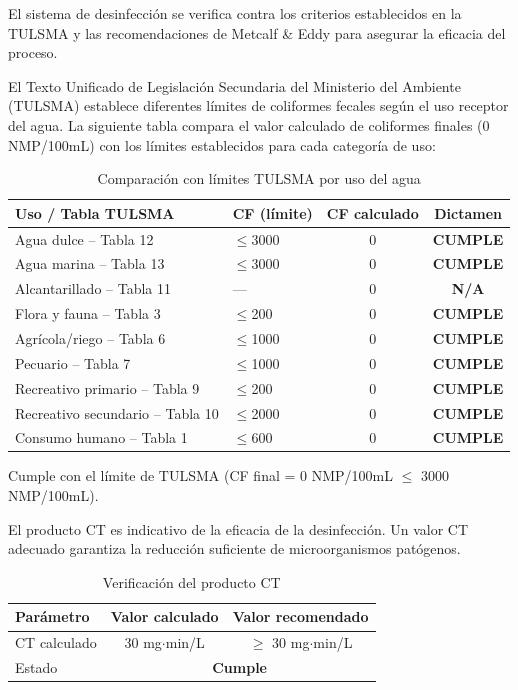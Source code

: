 \documentclass[12pt,a4paper]{article}
\begin{document}
El sistema de desinfección se verifica contra los criterios establecidos en la TULSMA y las recomendaciones de Metcalf \& Eddy para asegurar la eficacia del proceso.


El Texto Unificado de Legislación Secundaria del Ministerio del Ambiente (TULSMA) establece diferentes límites de coliformes fecales según el uso receptor del agua. La siguiente tabla compara el valor calculado de coliformes finales (0 NMP/100mL) con los límites establecidos para cada categoría de uso:

\begin{table}[H]
\centering
\caption{Comparación con límites TULSMA por uso del agua}
\small
\begin{tabular}{@{}llcc@{}}
\toprule
\textbf{Uso / Tabla TULSMA} & \textbf{CF (límite)} & \textbf{CF calculado} & \textbf{Dictamen} \\
\midrule
Agua dulce -- Tabla 12 & $\leq$3000 & 0 & \textbf{CUMPLE} \\
Agua marina -- Tabla 13 & $\leq$3000 & 0 & \textbf{CUMPLE} \\
Alcantarillado -- Tabla 11 & --- & 0 & \textbf{N/A} \\
Flora y fauna -- Tabla 3 & $\leq$200 & 0 & \textbf{CUMPLE} \\
Agrícola/riego -- Tabla 6 & $\leq$1000 & 0 & \textbf{CUMPLE} \\
Pecuario -- Tabla 7 & $\leq$1000 & 0 & \textbf{CUMPLE} \\
Recreativo primario -- Tabla 9 & $\leq$200 & 0 & \textbf{CUMPLE} \\
Recreativo secundario -- Tabla 10 & $\leq$2000 & 0 & \textbf{CUMPLE} \\
Consumo humano -- Tabla 1 & $\leq$600 & 0 & \textbf{CUMPLE} \\
\bottomrule
\end{tabular}
\end{table}

Cumple con el límite de TULSMA (CF final = 0 NMP/100mL $≤$ 3000 NMP/100mL).

El producto CT es indicativo de la eficacia de la desinfección. Un valor CT adecuado garantiza la reducción suficiente de microorganismos patógenos.

\begin{table}[H]
\centering
\caption{Verificación del producto CT}
\begin{tabular}{@{}lcc@{}}
\toprule
\textbf{Parámetro} & \textbf{Valor calculado} & \textbf{Valor recomendado} \\
\midrule
CT calculado & 30 mg$\cdot$min/L & $\geq$ 30 mg$\cdot$min/L \\
Estado & \multicolumn{2}{c}{\textbf{Cumple}} \\
\bottomrule
\end{tabular}
\end{table}
\end{document}
